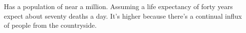 

  Has a population of near a million.
  Assuming a life expectancy of forty years expect about seventy deaths a day.
  It's higher because there's a continual influx of people from the countryside.
